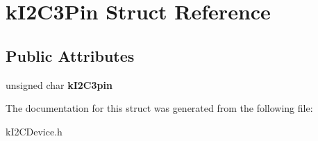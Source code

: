 \hypertarget{structkI2C3Pin}{}\section{k\+I2\+C3\+Pin Struct Reference}
\label{structkI2C3Pin}
\subsection*{Public Attributes}
\begin{DoxyCompactItemize}
\item 
unsigned char {\bfseries k\+I2\+C3pin}\hypertarget{structkI2C3Pin_a3c51fb13a36f122f537386a1795357ab}{}\label{structkI2C3Pin_a3c51fb13a36f122f537386a1795357ab}

\end{DoxyCompactItemize}


The documentation for this struct was generated from the following file\+:\begin{DoxyCompactItemize}
\item 
k\+I2\+C\+Device.\+h\end{DoxyCompactItemize}
